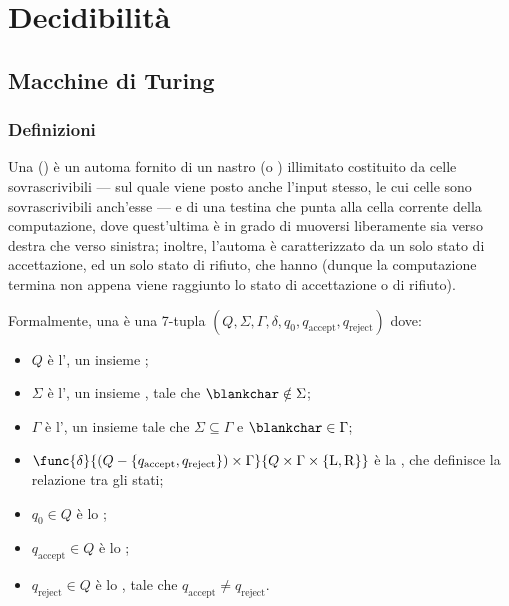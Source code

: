 \documentclass[a4paper, 12pt]{report}
\begin{document}
    \chapter{Decidibilità}

    \section{Macchine di Turing}

    \subsection{Definizioni}

    \begin{frameddefn}[label={tm},breakable]{\TM}
        Una \tbf{\TM} () è un automa fornito di un nastro (o ) illimitato costituito da celle sovrascrivibili --- sul quale viene posto anche l'input stesso, le cui celle sono sovrascrivibili anch'esse --- e di una testina che punta alla cella corrente della computazione, dove quest'ultima è in grado di muoversi liberamente sia verso destra che verso sinistra; inoltre, l'automa è caratterizzato da un solo stato di accettazione, ed un solo stato di rifiuto, che hanno  (dunque la computazione termina non appena viene raggiunto lo stato di accettazione o di rifiuto).

        Formalmente, una \TM è una 7-tupla $(Q, \Sigma, \Gamma, \delta, q_0, q_\mathrm{accept}, q_\mathrm{reject})$ dove:

        \begin{itemize}
            \item $Q$ è l', un insieme ;
            \item $\Sigma$ è l', un insieme , tale che $\blankchar \notin \Sigma$;
            \item $\Gamma$ è l', un insieme  tale che $\Sigma \subseteq \Gamma$ e $\blankchar \in \Gamma$;
            \item $\func{\delta}{(Q- \{q_\mathrm{accept}, q_\mathrm{reject}\}) \times \Gamma}{Q \times \Gamma \times \{ \mathrm L, \mathrm R\}}$ è la , che definisce la relazione tra gli stati;
            \item $q_0 \in Q$ è lo ;
            \item $q_\mathrm{accept} \in Q$ è lo ;
            \item $q_\mathrm{reject} \in Q$ è lo , tale che $q_\mathrm{accept} \neq q_\mathrm{reject}$.
        \end{itemize}


\end{frameddefn}
\end{document}
